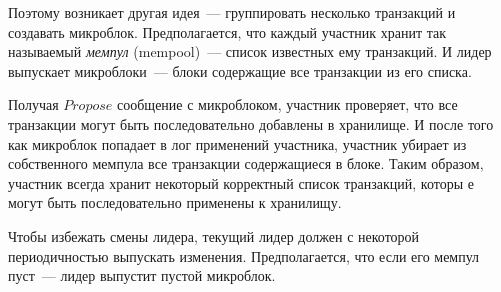 Поэтому возникает другая идея~--- группировать несколько транзакций и создавать микроблок. Предполагается, что каждый участник хранит так называемый \textit{мемпул} (mempool)~--- список известных ему транзакций. И лидер выпускает микроблоки~--- блоки содержащие все транзакции из его списка. 

Получая $Propose$ сообщение с микроблоком, участник проверяет, что все транзакции могут быть последовательно добавлены в хранилище.
И после того как микроблок попадает в лог применений участника, участник убирает из собственного мемпула все транзакции содержащиеся в блоке. Таким образом, участник всегда хранит некоторый корректный список транзакций, которы	е могут быть последовательно применены к хранилищу.

Чтобы избежать смены лидера, текущий лидер должен с некоторой периодичностью выпускать изменения. Предполагается, что если его мемпул пуст~--- лидер выпустит пустой микроблок.

